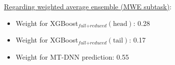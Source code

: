 \documentclass{dcthesis}
\theoremstyle{definition}
\theoremstyle{remark}
\begin{document}
\noindent \underline{Regarding weighted average ensemble (MWE subtask)}:
\begin{itemize}
  \item Weight for XGBoost$_{\textit{full}+\textit{reduced}}(\text{head})$: 0.28
  \item Weight for XGBoost$_{\textit{full}+\textit{reduced}}(\text{tail})$: 0.17
  \item Weight for MT-DNN prediction: 0.55
\end{itemize}

\backmatter





\end{document}
